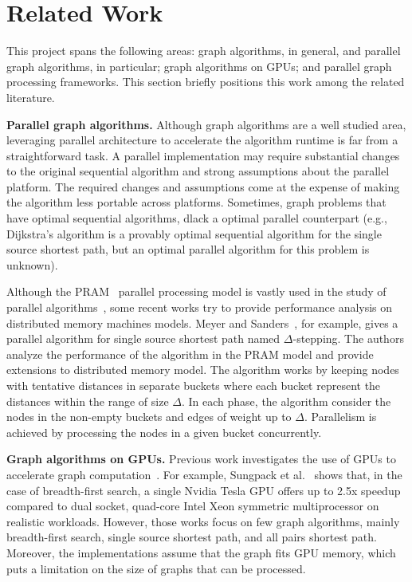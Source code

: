 \section{Related Work}
\label{sec:related}


This project spans the following areas: graph algorithms, in general, and parallel graph algorithms, in particular; graph algorithms on GPUs; and parallel graph processing frameworks. This section briefly positions this work among the related literature.

{\bf Parallel graph algorithms.} Although graph algorithms are a well studied area, leveraging parallel architecture to accelerate the algorithm runtime is far from a straightforward task. A parallel implementation may require substantial changes to the original sequential algorithm and strong assumptions about the parallel platform. The required changes and assumptions come at the expense of making the algorithm less portable across platforms. Sometimes, graph problems that have optimal sequential algorithms, dlack a optimal parallel counterpart (e.g., Dijkstra's algorithm is a provably optimal sequential algorithm for the single source shortest path, but an optimal parallel algorithm for this problem is unknown).  

Although the PRAM~\cite{Fortune78} parallel processing model is vastly used in the study of parallel algorithms~\cite{Quinn1984,Atallah1984}, some recent works try to provide performance analysis on distributed memory machines models. Meyer and Sanders~\cite{Meyer2003}, for example, gives a parallel algorithm for single source shortest path named $\Delta$-stepping. The authors analyze the performance of the algorithm in the PRAM model and provide extensions to distributed memory model. The algorithm works by keeping nodes with tentative distances in separate buckets where each bucket represent the distances within the range of size $\Delta$. In each phase, the algorithm consider the nodes in the non-empty buckets and edges of weight up to $\Delta$. Parallelism is achieved by processing the nodes in a given bucket concurrently. 

{\bf Graph algorithms on GPUs.} Previous work investigates the use of GPUs to accelerate graph computation~\cite{Harish2007, Katz2008, Sungpack2010, dehne2010exploring}. For example, Sungpack et al.~\cite{Sungpack2010} shows that, in the case of breadth-first search, a single Nvidia Tesla GPU offers up to 2.5x speedup compared to dual socket, quad-core Intel Xeon symmetric multiprocessor on realistic workloads. However, those works focus on few graph algorithms, mainly breadth-first search, single source shortest path, and all pairs shortest path. Moreover, the implementations assume that the graph fits GPU memory, which puts a limitation on the size of graphs that can be processed. 

